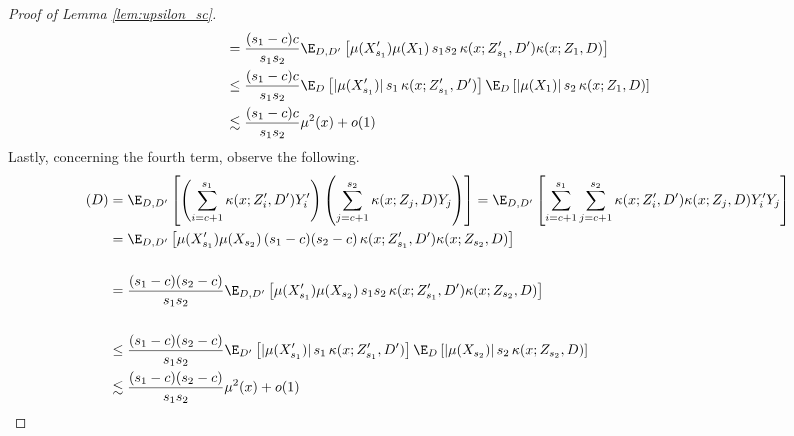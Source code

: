 \begin{proof}[Proof of Lemma \ref{lem:upsilon_sc}]
\begin{equation}
\begin{aligned}
			 & = \frac{(s_1 - c)c}{s_1 s_2}\E_{D, D^{\prime}}\left[\mu(X_{s_1}^{\prime})\mu(X_1) \, s_1 s_2 \, \kappa(x; Z_{s_1}^{\prime}, D^{\prime})\kappa(x; Z_1, D)\right] \\
			 & \leq \frac{(s_1 - c)c}{s_1 s_2}
			\E_{D}\left[|\mu(X_{s_1}^{\prime})| \, s_1 \, \kappa(x; Z_{s_1}^{\prime}, D^{\prime})\right]
			\E_{D}\left[|\mu(X_1)| \, s_2 \, \kappa(x; Z_1, D)\right]                                                                                                                             \\
			 & \lesssim \frac{(s_1 - c)c}{s_1 s_2} \mu^2(x) + o(1)
		\end{aligned}
	\end{equation}
	Lastly, concerning the fourth term, observe the following.
	\begin{equation}
		\begin{aligned}
			(D)
			 & = \E_{D, D^{\prime}}\left[\left(\sum_{i = c+1}^{s_1}\kappa(x; Z_{i}^{\prime}, D^{\prime}) Y_{i}^{\prime}\right)
				\left(\sum_{j = c+1}^{s_2} \kappa(x; Z_j, D) Y_j\right)\right]
			= \E_{D, D^{\prime}}\left[\sum_{i = c+1}^{s_1}\sum_{j = c+1}^{s_2}\kappa(x; Z_{i}^{\prime}, D^{\prime}) \kappa(x; Z_j, D)  Y_{i}^{\prime}Y_j\right]                                                        \\
			 & = \E_{D, D^{\prime}}\left[\mu(X_{s_1}^{\prime}) \mu(X_{s_2}) \, (s_1 - c)(s_2 -c) \,\kappa(x; Z_{s_1}^{\prime}, D^{\prime}) \kappa(x; Z_{s_2}, D)  \right]                        \\                                                                                                                                                                       \\
			 & = \frac{(s_1 - c)(s_2 -c)}{s_1 s_2}\E_{D, D^{\prime}}\left[\mu(X_{s_1}^{\prime}) \mu(X_{s_2}) \, s_1 s_2 \,\kappa(x; Z_{s_1}^{\prime}, D^{\prime}) \kappa(x; Z_{s_2}, D)  \right] \\                                                                                                                                                                       \\
			 & \leq \frac{(s_1 - c)(s_2 -c)}{s_1 s_2}
			\E_{D^{\prime}}\left[|\mu(X_{s_1}^{\prime})| \, s_1 \,\kappa(x; Z_{s_1}^{\prime}, D^{\prime})   \right]
			\E_{D}\left[ |\mu(X_{s_2})| \, s_2 \, \kappa(x; Z_{s_2}, D)  \right]                                                                                                                                    \\
			 & \lesssim \frac{(s_1 - c)(s_2 -c)}{s_1 s_2}\mu^2(x) + o(1)
		\end{aligned}
	\end{equation}
\end{proof}

